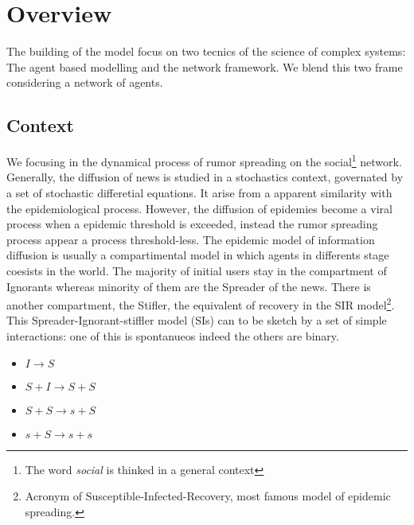 \documentclass[11pt]{article} %
\begin{document}
\section{Overview}
 The building of the model focus on two tecnics of the science of complex systems: The agent based modelling and the network framework. 
We blend this two frame considering a network of agents. 
\subsection{Context}
We focusing in the dynamical process of rumor spreading on the social\footnote{The word {\itshape social} is thinked in a general context} network. Generally, the diffusion of news is studied in a stochastics context, governated by a set of stochastic differetial equations. It arise from a apparent similarity with the epidemiological process. However, the diffusion of epidemies become a viral process when a epidemic threshold is exceeded, instead the rumor spreading process appear a process threshold-less.  The epidemic model of information diffusion is usually a compartimental model in which agents in differents stage coesists in the world.
The majority of initial users stay in the compartment of Ignorants whereas minority of them are the Spreader of the news. There is another compartment, the Stifler, the equivalent of recovery in the SIR model\footnote{Acronym of Susceptible-Infected-Recovery, most famous model of epidemic spreading.}. 
\\ This Spreader-Ignorant-stiffler model (SIs) can to be sketch by a set of simple interactions: one of this is spontanueos indeed the others are binary.
\begin{itemize}
\item$ I \longrightarrow S$
\item $S+I \longrightarrow S + S$

\item $S + S \longrightarrow s + S$

\item $s + S \longrightarrow  s + s$
\end{itemize}
\end{document}
